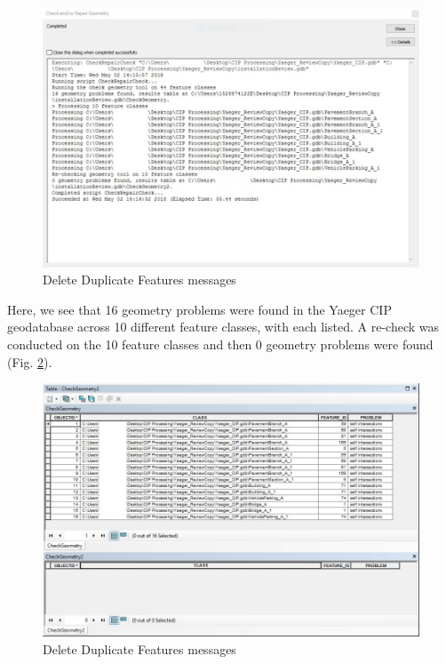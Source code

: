 \documentclass[openany]{book}
\theoremstyle{definition}
\theoremstyle{definition}
\theoremstyle{definition}
\theoremstyle{remark}
\begin{document}
\begin{figure}[H]

{\centering \includegraphics{figures/chkG-messages} 

}

\caption{Delete Duplicate Features messages}\label{fig:chkGmessages}
\end{figure}

Here, we see that 16 geometry problems were found in the Yaeger CIP
geodatabase across 10 different feature classes, with each listed. A
re-check was conducted on the 10 feature classes and then 0 geometry
problems were found (Fig. \ref{fig:chkGafter}).

\begin{figure}[H]

{\centering \includegraphics{figures/chkG-after} 

}

\caption{Delete Duplicate Features messages}\label{fig:chkGafter}
\end{figure}
\end{document}
